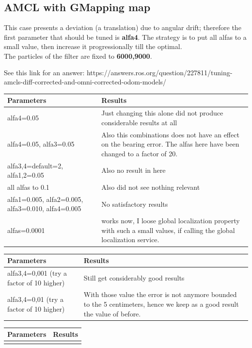 \documentclass[11pt,a4paper]{article}
\begin{document}
\subsection{AMCL with GMapping map}

This case presents a deviation (a translation) due to angular drift; therefore the first parameter that should be tuned is \textbf{alfa4}. The strategy is to put all alfas to a small value, then increase it progressionally till the optimal. \\
The particles of the filter are fixed to \textbf{6000,9000}.

See this link for an answer: https://answers.ros.org/question/227811/tuning-amcls-diff-corrected-and-omni-corrected-odom-models/

\newpage
\begin{center}
\begin{tabular}{| m{12em} | m{13em}|} 
\hline
\textbf{Parameters} & \textbf{Results} \\
\hline
 alfa4=0.05 &  Just changing this alone did not produce considerable results at all\\
\hline
 alfa4=0.05, alfa3=0.05 &  Also this combinations does not have an effect on the bearing error. The alfas here have been changed to a factor of 20.\\
\hline
 alfa3,4=default=2, alfa1,2=0.05 & Also no result in here \\
\hline
all alfas to 0.1 & Also did not see nothing relevant\\
\hline
alfa1=0.005, alfa2=0.005, alfa3=0.010, alfa4=0.005& No satisfactory results\\
\hline
alfas=0.0001 & works now, I loose global localization property with such a small values, if calling the global localization service. \\
\hline
\end{tabular}
\end{center}

\begin{center}
\begin{tabular}{| m{12em} | m{13em}|} 
\hline
\textbf{Parameters} & \textbf{Results} \\
\hline
alfa3,4=0,001 (try a factor of 10 higher) & Still get considerably good results \\
\hline
\hline
alfa3,4=0,01 (try a factor of 10 higher) & With those value the error is not anymore bounded to the 5 centimeters, hence we keep as a good result the value of before. \\
\hline
\end{tabular}
\end{center}

\begin{center}
\begin{tabular}{| m{12em} | m{13em}|} 
\hline
\textbf{Parameters} & \textbf{Results} \\
\hline
& \\
\hline
\hline
\hline
\end{tabular}
\end{center}
\end{document}
